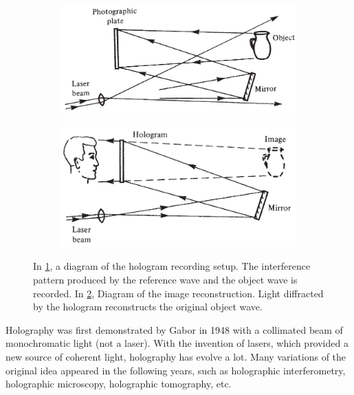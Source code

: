 \documentclass[11pt,a4paper]{article}
\begin{document}
\begin{figure}[ht]
\centering
\begin{subfigure}[b]{0.48\textwidth}
\includegraphics[width=\textwidth]{Hologram_recording}
\caption{}
\label{fig:hologram_recording}
\end{subfigure}
\begin{subfigure}[b]{0.48\textwidth}
\includegraphics[width=\textwidth]{Hologram_image_reconstruction}
\caption{}
\label{fig:hologram_reconstruction}
\end{subfigure}
\caption{In \ref{fig:hologram_recording}, a diagram of the hologram recording setup. The interference pattern produced by the reference wave and the object wave is recorded. In \ref{fig:hologram_reconstruction}, Diagram of the image reconstruction. Light diffracted by the hologram reconstructs the original object wave.\cite{hariharan_2002}}
\label{fig:holograms}
\end{figure}

Holography was first demonstrated by Gabor in 1948 with a collimated beam of monochromatic light (not a laser). With the invention of lasers, which provided a new source of coherent light, holography has evolve a lot. Many variations of the original idea appeared in the following years, such as holographic interferometry, holographic microscopy, holographic tomography, etc.
\end{document}

